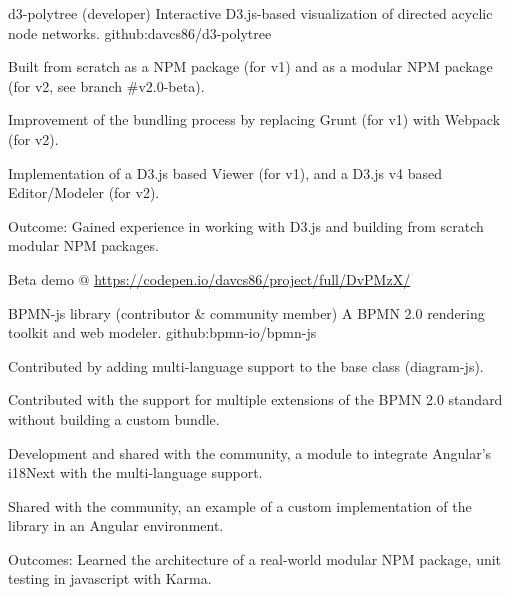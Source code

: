 


\begin{cventries}


\cventry
{d3-polytree (developer)} %
{Interactive D3.js-based visualization of directed acyclic node networks.} %
{ } %
{github:davcs86/d3-polytree} %
{ %
	\begin{cvitems}
		\item {Built from scratch as a NPM package (for v1) and as a modular NPM package (for v2, see branch \#v2.0-beta).}
		\item {Improvement of the bundling process by replacing Grunt (for v1) with Webpack (for v2).}
		\item {Implementation of a D3.js based Viewer (for v1), and a D3.js v4 based Editor/Modeler (for v2).}
		\item {Outcome: Gained experience in working with D3.js and building from scratch modular NPM packages.}
		\item {Beta demo @ \url{https://codepen.io/davcs86/project/full/DvPMzX/}}
	\end{cvitems}
}


\cventry
{BPMN-js library (contributor \& community member)} %
{A BPMN 2.0 rendering toolkit and web modeler.} %
{ } %
{github:bpmn-io/bpmn-js} %
{ %
	\begin{cvitems}
		\item {Contributed by adding multi-language support to the base class (diagram-js).}
		\item {Contributed with the support for multiple extensions of the BPMN 2.0 standard without building a custom bundle.}
		\item {Development and shared with the community, a module to integrate Angular's i18Next with the multi-language support.}
		\item {Shared with the community, an example of a custom implementation of the library in an Angular environment.}
		\item {Outcomes: Learned the architecture of a real-world modular NPM package, unit testing in javascript with Karma.}
	\end{cvitems}
}


\end{cventries}
